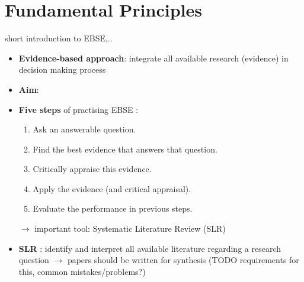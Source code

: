 \section{Fundamental Principles}

short introduction to EBSE,..

\begin{itemize}
	\item \textbf{Evidence-based approach}: integrate all available research (evidence) in decision making process
	\item \textbf{Aim}:  \cite{EBSEpract}
	\item \textbf{Five steps} of practising EBSE \cite{EBSE}:
		\begin{enumerate}
			\item Ask an answerable question.
			\item Find the best evidence that answers that question.
			\item Critically appraise this evidence.
			\item Apply the evidence (and critical appraisal).
			\item Evaluate the performance in previous steps.
		\end{enumerate}
		$\rightarrow$ important tool: Systematic Literature Review (SLR)
	\item \textbf{SLR} \cite{keele2007}: identify and interpret all available literature regarding a research question
		$\rightarrow$ papers should be written for synthesis (TODO requirements for this, common mistakes/problems?)
\end{itemize}